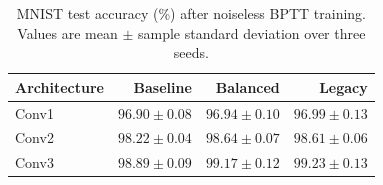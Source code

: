 \begin{table}[!htbp]
\centering
\small
\setlength{\tabcolsep}{6pt}
\begin{tabular}{lrrr}
\toprule
Architecture & Baseline & Balanced & Legacy \\
\midrule
Conv1 & $96.90 \pm 0.08$ & $96.94 \pm 0.10$ & $96.99 \pm 0.13$ \\
Conv2 & $98.22 \pm 0.04$ & $98.64 \pm 0.07$ & $98.61 \pm 0.06$ \\
Conv3 & $98.89 \pm 0.09$ & $99.17 \pm 0.12$ & $99.23 \pm 0.13$ \\
\bottomrule
\end{tabular}
\caption{MNIST test accuracy (\%) after noiseless BPTT training. Values are mean $\pm$ sample standard deviation over three seeds.}
\label{tab:wide-bptt-test}
\end{table}
